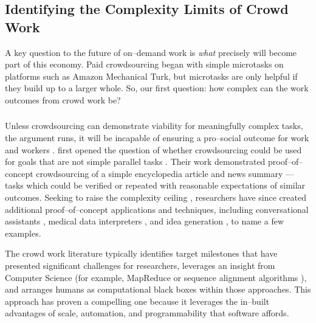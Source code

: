 \documentclass[trackingWork]{subfiles}
\begin{document}
\begin{comment}
Crowdwork
  - Kittur said let's do complex stuff
  - This works by using CS techniques
  - Clear that this works in focused cases
  - More recent shift toward using experts
\end{comment}

\subsection[What are the complexity limits of crowd work]
{Identifying the Complexity Limits of Crowd Work}\label{sec:complexity}
A key question to the future of on--demand work
 is
\textit{what} precisely will become part of this economy.
Paid crowdsourcing began with simple microtasks on platforms such as
Amazon Mechanical Turk, but
microtasks are only helpful if they build up to a larger whole.
So, our first question:
how complex can the work outcomes from crowd work be?

\subsubsection{\crowdworkpers}

Unless crowdsourcing can demonstrate viability for meaningfully complex tasks,
the argument runs,
it will be incapable of ensuring a pro--social outcome for work and workers
\cite{crowdworkFuture}.
\citeauthor{crowdForgeKittur} first opened the question of
whether crowdsourcing could be used for goals that are not simple parallel tasks
\cite{crowdForgeKittur}.
Their work demonstrated proof--of--concept crowdsourcing of
a simple encyclopedia article and news summary
--- tasks which could be verified or repeated
with reasonable expectations of similar outcomes.
Seeking to raise the complexity ceiling
\cite{myers2000past},
researchers have since created
additional proof--of--concept applications and techniques,
including conversational assistants \cite{Lasecki:2013:CCC:2501988.2502057},
medical data interpreters \cite{Lasecki:2013:CCC:2501988.2502057}, and
idea generation \cite{YuEncouragingOutside,yu2014distributed,Yu2016a},
to name a few examples.

The crowd work literature typically identifies target milestones that have
presented significant challenges for researchers,
leverages an insight from Computer Science
(for example, MapReduce
\cite{crowdForgeKittur} or
sequence alignment algorithms
\cite{lasecki2012real}),
and arranges humans as computational black boxes within those approaches.
This approach has proven a compelling one because
it leverages the in--built advantages of
scale,
automation, and
programmability that software affords.
\end{document}
